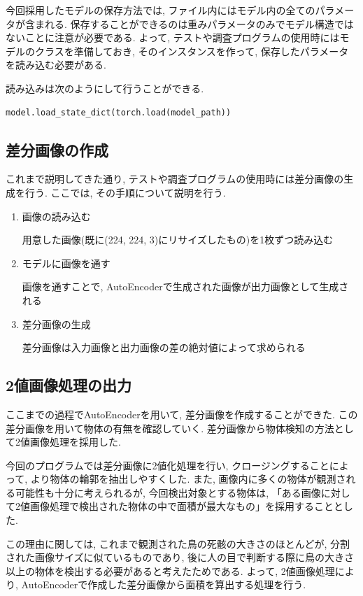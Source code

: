 \documentclass[dvipdfmx]{jsarticle}
\begin{document}
今回採用したモデルの保存方法では, ファイル内にはモデル内の全てのパラメータが含まれる.
保存することができるのは重みパラメータのみでモデル構造ではないことに注意が必要である.
よって, テストや調査プログラムの使用時にはモデルのクラスを準備しておき, そのインスタンスを作って, 保存したパラメータを読み込む必要がある.

読み込みは次のようにして行うことができる.
\begin{lstlisting}
model.load_state_dict(torch.load(model_path))   
\end{lstlisting}

\subsection{差分画像の作成}
これまで説明してきた通り, テストや調査プログラムの使用時には差分画像の生成を行う.
ここでは, その手順について説明を行う.

\begin{enumerate}
    \item 画像の読み込む

    用意した画像(既に(224, 224, 3)にリサイズしたもの)を1枚ずつ読み込む
    
    \item モデルに画像を通す

    画像を通すことで, AutoEncoderで生成された画像が出力画像として生成される
    \item 差分画像の生成

    差分画像は入力画像と出力画像の差の絶対値によって求められる
    
    
\end{enumerate}
\subsection{2値画像処理の出力}
ここまでの過程でAutoEncoderを用いて, 差分画像を作成することができた.
この差分画像を用いて物体の有無を確認していく.
差分画像から物体検知の方法として2値画像処理を採用した.

今回のプログラムでは差分画像に2値化処理を行い, クロージングすることによって, より物体の輪郭を抽出しやすくした.
また, 画像内に多くの物体が観測される可能性も十分に考えられるが, 
今回検出対象とする物体は, 「ある画像に対して2値画像処理で検出された物体の中で面積が最大なもの」を採用することとした.

この理由に関しては, これまで観測された鳥の死骸の大きさのほとんどが, 分割された画像サイズに似ているものであり, 
後に人の目で判断する際に鳥の大きさ以上の物体を検出する必要があると考えたためである.
よって, 2値画像処理により, AutoEncoderで作成した差分画像から面積を算出する処理を行う.
\end{document}
